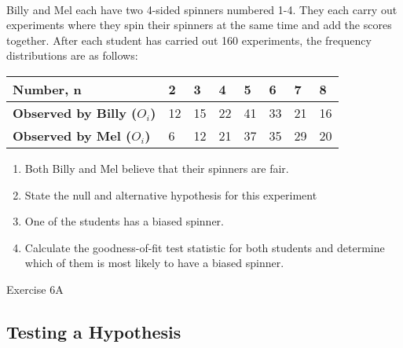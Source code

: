 \documentclass[fleqn]{article}
\begin{document}
\begin{examplebox}{}{}
    \\ %
    Billy and Mel each have two 4-sided spinners numbered 1-4. They each carry out experiments where they spin their spinners at the same time and add the scores together. After each student has carried out 160 experiments, the frequency distributions are as follows:

    \begin{center}
    \begin{minipage}[t]{0.9\linewidth}
        \begin{tabularx}{\textwidth}{|X|*7{P{11mm}|}}
            \hline
            \textbf{Number, n} & 2 & 3 & 4 & 5 & 6 & 7 & 8                          \\\hline
            \textbf{Observed by Billy ($O_i$)} & 12 & 15 & 22 & 41 & 33 & 21 & 16   \\\hline
            \textbf{Observed by Mel ($O_i$)} & 6 & 12 & 21 & 37 & 35 & 29 & 20      \\\hline
        \end{tabularx}
        \vspace{4mm}
    \end{minipage}
    \end{center}
    
    \begin{enumerate}[label*=\bfseries (\alph*), leftmargin=*]
        \item[] Both Billy and Mel believe that their spinners are fair.
        \item State the null and alternative hypothesis for this experiment \vspace{3mm}
        \item[] One of the students has a biased spinner. 
        \item Calculate the goodness-of-fit test statistic for both students and determine which of them is most likely to have a biased spinner.
    \end{enumerate}
\end{examplebox}
\vfill

\begin{practice*}{Exercise 6A}{}
\end{practice*}

\newpage

\subsection{Testing a Hypothesis}
\end{document}
